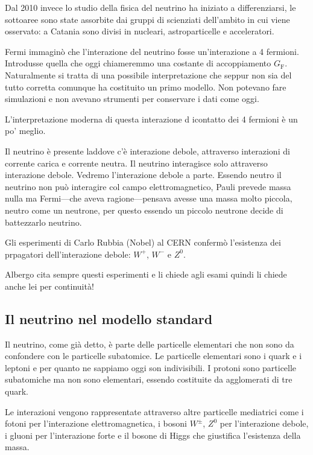         Dal 2010 invece lo studio della fisica del neutrino ha iniziato a differenziarsi, le sottoaree sono state assorbite dai gruppi di scienziati dell'ambito in cui viene osservato: a Catania sono divisi in nucleari, astroparticelle e acceleratori.

        Fermi immaginò che l'interazione del neutrino fosse un'interazione a 4 fermioni. Introdusse quella che oggi chiameremmo una costante di accoppiamento $G_\text{F}$. Naturalmente si tratta di una possibile interpretazione che seppur non sia del tutto corretta comunque ha costituito un primo modello. Non potevano fare simulazioni e non avevano strumenti per conservare i dati come oggi.

        L'interpretazione moderna di questa interazione d icontatto dei 4 fermioni è un po' meglio. 

        Il neutrino è presente laddove c'è interazione debole, attraverso interazioni di corrente carica e corrente neutra. Il neutrino interagisce solo attraverso interazione debole. Vedremo l'interazione debole a parte. Essendo neutro il neutrino non può interagire col campo elettromagnetico, Pauli prevede massa nulla ma Fermi---che aveva ragione---pensava avesse una massa molto piccola, neutro come un neutrone, per questo essendo un piccolo neutrone decide di battezzarlo neutrino.

        Gli esperimenti di Carlo Rubbia (Nobel) al CERN confermò l'esistenza dei prpagatori dell'interazione debole: $W^+$, $W^-$ e $Z^0$.

        Albergo cita sempre questi esperimenti e li chiede agli esami quindi li chiede anche lei per continuità!
    \subsection{Il neutrino nel modello standard}
        Il neutrino, come già detto, è parte delle particelle elementari che non sono da confondere con le particelle subatomice. Le particelle elementari sono i quark e i leptoni e per quanto ne sappiamo oggi son indivisibili. I protoni sono particelle subatomiche ma non sono elementari, essendo costituite da agglomerati di tre quark.

        Le interazioni vengono rappresentate attraverso altre particelle mediatrici come i fotoni per l'interazione elettromagnetica, i bosoni $W^\pm$, $Z^0$ per l'interazione debole, i gluoni per l'interazione forte e il bosone di Higgs che giustifica l'esistenza della massa.

